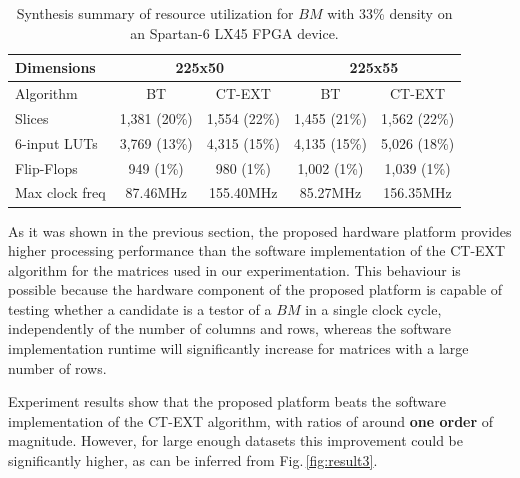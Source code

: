 \documentclass[authoryear,preprint,review,12pt]{elsarticle}
\begin{document}
\begin{table}[htb]
\caption{Synthesis summary of resource utilization for $BM$ with 33\% density on an Spartan-6 LX45 
FPGA device.} \label{table:7}
\begin{center}
    \begin{tabular}{lcccc}   \hline
    	    Dimensions & \multicolumn{2}{c}{225x50} & \multicolumn{2}{c}{225x55} \\ \hline
    	    Algorithm & BT & CT-EXT & BT & CT-EXT \\ \hline 
        Slices & 1,381 (20\%) & 1,554 (22\%) & 1,455 (21\%) & 1,562 (22\%) \\
        6-input LUTs & 3,769 (13\%) & 4,315 (15\%) & 4,135 (15\%) & 5,026 (18\%)\\
        Flip-Flops & 949 (1\%) & 980 (1\%) & 1,002 (1\%) & 1,039 (1\%)\\
        Max clock freq & 87.46MHz & 155.40MHz & 85.27MHz & 156.35MHz\\ \hline
    \end{tabular}
\end{center}
\end{table}


As it was shown in the previous section, the proposed hardware platform provides higher processing
performance than the software implementation of the CT-EXT
algorithm for the matrices used in our experimentation. 
This behaviour is possible because the hardware
component of the proposed platform is capable of testing whether a 
candidate is a testor of a $BM$ in a single clock cycle,
independently of the number of columns and rows, whereas
the software implementation runtime will significantly
increase for matrices with a large number of rows.

Experiment results show that the proposed platform beats the software implementation of
the CT-EXT algorithm, with ratios of around \textbf{one order} of magnitude. However, for large 
enough datasets this improvement could be significantly higher, as can be inferred from 
Fig.\,\ref{fig:result3}.
\end{document}
